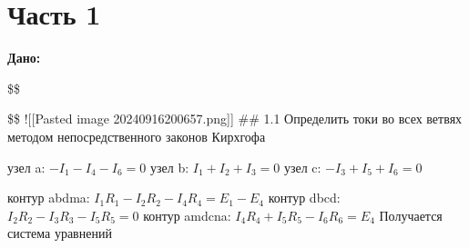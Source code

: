 \documentclass[
]{article}
\author{}
\date{}
\begin{document}
\section{Часть 1}\label{ux447ux430ux441ux442ux44c-1}

\textbf{Дано:}

\$\$


\$\$ !{[}{[}Pasted image 20240916200657.png{]}{]} \#\# 1.1 Определить
токи во всех ветвях методом непосредственного законов Кирхгофа

узел a: \(-I_{1} - I_{4} - I_{6} = 0\) узел b:
\(I_{1} + I_{2} + I_{3} = 0\) узел c: \(-I_{3} + I_{5} + I_{6} = 0\)

контур abdma: \(I_{1}R_{1} - I_{2}R_{2} - I_{4}R_{4} = E_{1} - E_{4}\)
контур dbcd: \(I_{2}R_{2} - I_{3}R_{3} - I_{5}R_{5} = 0\) контур amdcna:
\(I_{4}R_{4} + I_{5}R_{5} - I_{6}R_{6} = E_{4}\) Получается система
уравнений
\end{document}
